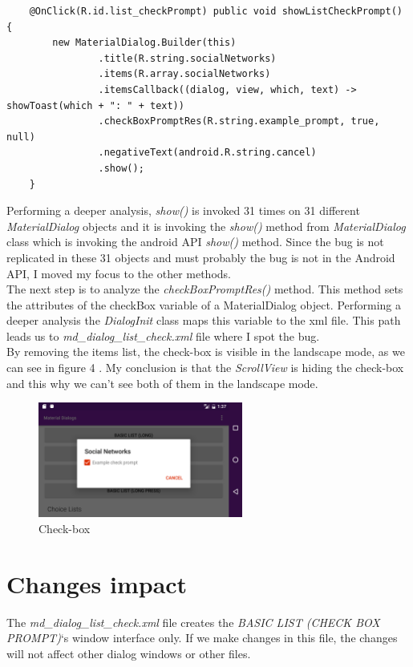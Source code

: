 \documentclass[12pt]{report}
\begin{document}
	\begin{lstlisting}
    @OnClick(R.id.list_checkPrompt) public void showListCheckPrompt() {
        new MaterialDialog.Builder(this)
                .title(R.string.socialNetworks)
                .items(R.array.socialNetworks)
                .itemsCallback((dialog, view, which, text) -> showToast(which + ": " + text))
                .checkBoxPromptRes(R.string.example_prompt, true, null)
                .negativeText(android.R.string.cancel)
                .show();
    }
\end{lstlisting}
\noindent
  Performing a deeper analysis, \emph{show()} is invoked 31 times on 31 different \emph{MaterialDialog} objects and it is invoking the \emph{show()} method from \emph{MaterialDialog} class which is invoking the android API \emph{show()} method. Since the bug is not replicated in these 31 objects and must probably the bug is not in the Android API, I moved my focus to the other methods.\\
  The next step is to analyze the \emph{checkBoxPromptRes()} method. This method sets the attributes of the checkBox variable of a MaterialDialog object. Performing a deeper analysis the \emph{DialogInit} class maps this variable to the xml file. This path leads us to \emph{md\_dialog\_list\_check.xml} file where I spot the bug.\\
  By removing the items list, the check-box is visible in the landscape mode, as we can see in figure 4 . My conclusion is that the \emph{ScrollView} is hiding the check-box and this why we can't see both of them in the landscape mode.
  \begin{figure}[H]
  \centering
  \includegraphics[width=0.6\textwidth]{screenshots/checkbox.png}
  \caption{Check-box}
\end{figure}

\section*{Changes impact}
The \emph{md\_dialog\_list\_check.xml} file creates the \emph{BASIC LIST (CHECK BOX PROMPT)}`s window interface only. If we make changes in this file, the changes will not affect other dialog windows or other files.
 
\end{document}
